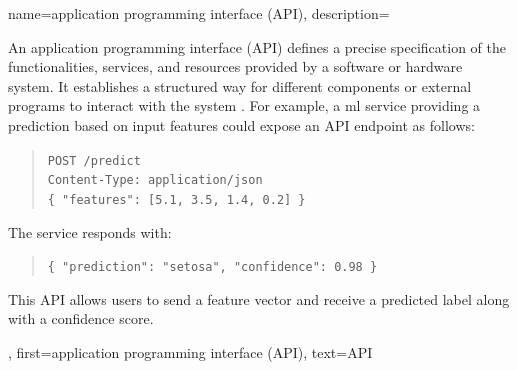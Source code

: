 


{name={application programming interface (API)},
	description={An application programming 
		interface (API) defines a precise specification of the functionalities, services, 
		and resources provided by a software or hardware system. It establishes a 
		structured way for different components or external programs to interact with 
		the system \cite{RestfulBook2013}. For example, a \gls{ml} service 
		providing a \gls{prediction} based on input \gls{feature}s could expose an 
		API endpoint as follows:
		\begin{quote}
		\texttt{POST /predict}\\
		\texttt{Content-Type: application/json}\\
		\texttt{\{ "features": [5.1, 3.5, 1.4, 0.2] \}}
		\end{quote}
		The service responds with:
		\begin{quote} 
		\texttt{\{ "prediction": "setosa", "confidence": 0.98 \}}
		\end{quote}
		This API allows users to send a feature vector and receive a predicted 
		label along with a confidence score.
	},
	first={application programming interface (API)},
	text={API}
}


